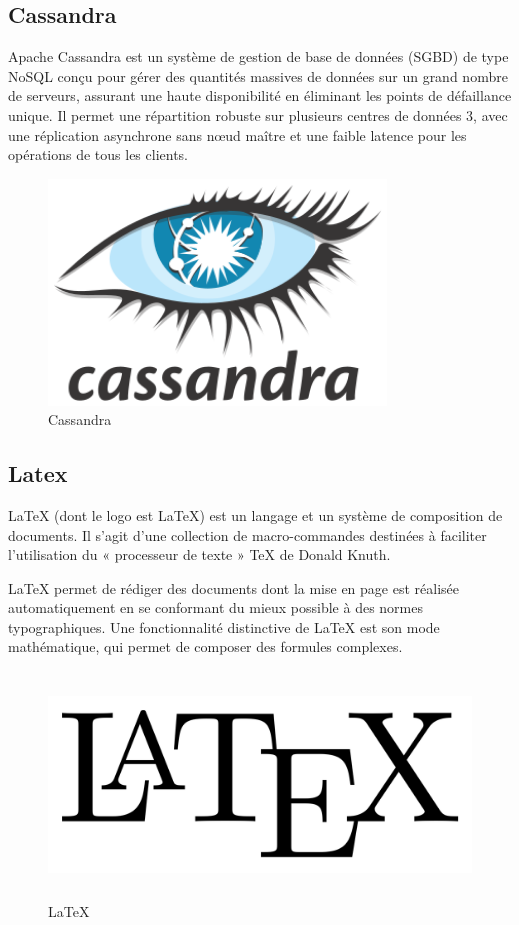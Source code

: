 \subsection{Cassandra}

Apache Cassandra est un système de gestion de base de données (SGBD) de type NoSQL conçu pour gérer des quantités massives de données sur un grand nombre de serveurs, assurant une haute disponibilité en éliminant les points de défaillance unique. Il permet une répartition robuste sur plusieurs centres de données 3, avec une réplication asynchrone sans nœud maître et une faible latence pour les opérations de tous les clients.

\begin{figure}[!h]
\begin{center}
\includegraphics[height=6cm]{Cassandra.svg.png}
\end{center}
\caption{Cassandra}
\end{figure}

\subsection{Latex}

LaTeX (dont le logo est \LaTeX) est un langage et un système de composition de documents. Il s'agit d'une collection de macro-commandes destinées à faciliter l'utilisation du « processeur de texte » TeX de Donald Knuth.

LaTeX permet de rédiger des documents dont la mise en page est réalisée automatiquement en se conformant du mieux possible à des normes typographiques. Une fonctionnalité distinctive de LaTeX est son mode mathématique, qui permet de composer des formules complexes.

\begin{figure}[!h]
\begin{center}
\includegraphics[height=6cm]{LaTeX.svg.png}
\end{center}
\caption{\LaTeX}
\end{figure}

